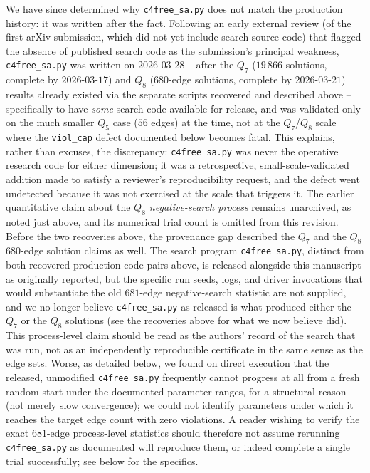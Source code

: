 \documentclass[12pt,a4paper]{article}
\theoremstyle{definition}
\begin{document}
We have since determined why \texttt{c4free\_sa.py} does not match the
production history: it was written after the fact. Following an
early external review (of the first arXiv submission, which did not
yet include search source code) that flagged the absence of published
search code as the submission's principal weakness, \texttt{c4free\_sa.py}
was written on $2026$-$03$-$28$ -- after the $Q_7$ ($19\,866$
solutions, complete by $2026$-$03$-$17$) and $Q_8$ ($680$-edge
solutions, complete by $2026$-$03$-$21$) results already existed via
the separate scripts recovered and described above -- specifically to
have \emph{some} search code available for release, and was validated
only on the much smaller $Q_5$ case ($56$ edges) at the time, not at
the $Q_7$/$Q_8$ scale where the \texttt{viol\_cap} defect documented
below becomes fatal. This explains, rather than excuses, the
discrepancy: \texttt{c4free\_sa.py} was never the operative research
code for either dimension; it was a retrospective, small-scale-validated
addition made to satisfy a reviewer's reproducibility request, and the
defect went undetected because it was not exercised at the scale that
triggers it. The earlier quantitative claim about the \emph{$Q_8$ negative-search
process} remains unarchived, as noted just above, and its numerical trial
count is omitted from this revision. Before the two recoveries above, the
provenance gap described the $Q_7$ and the $Q_8$ $680$-edge solution claims
as well. The
search program \texttt{c4free\_sa.py}, distinct from both recovered
production-code pairs above,
is released alongside
this manuscript as originally reported, but the specific run seeds, logs, and driver
invocations that would substantiate the old $681$-edge negative-search statistic are not supplied,
and we no longer believe \texttt{c4free\_sa.py} as released is what
produced either the $Q_7$ or the $Q_8$ solutions (see the recoveries
above for what we now believe did).
This process-level claim should be read as the authors' record of the
search that was run, not as an independently reproducible certificate in
the same sense as the edge sets. Worse, as detailed
below, we found
on direct execution that the released, unmodified
\texttt{c4free\_sa.py} frequently cannot progress at all from a fresh
random start under the documented parameter ranges, for a structural
reason (not merely slow convergence); we could not identify parameters
under which it reaches the target edge count with zero violations. A
reader wishing to verify the exact $681$-edge process-level statistics should
therefore not assume rerunning \texttt{c4free\_sa.py} as documented will
reproduce them, or indeed complete a single trial successfully; see
below for the specifics.
\end{document}

